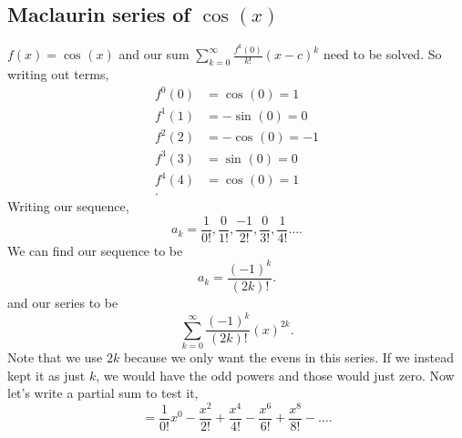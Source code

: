 \documentclass[a4paper]{article}
\begin{document}
\subsection*{Maclaurin series of $ \cos^{  } \left( x \right)  $}%
\begin{exampleblock}{}
	 $ f\left( x \right) =\cos^{  } \left( x \right)  $ and our sum $ \sum_{ k=0 } ^{ \infty } \frac{ f^{ k }\left( 0 \right)  }{ k! }\left( x-c \right) ^{ k } $ need to be solved. So writing out terms,
	 \begin{align*}
			f^{ 0 }\left( 0 \right) &= \cos^{  } \left( 0 \right) =1 \\
			f^{ 1 }\left( 1 \right) &= -\sin^{  } \left( 0 \right) =0 \\
			f^{ 2 }\left( 2 \right) &= -\cos^{  } \left( 0 \right) =-1 \\
			f^{ 3 }\left( 3 \right) &= \sin^{  } \left( 0 \right) =0 \\
			f^{ 4 }\left( 4 \right) &= \cos^{  } \left( 0 \right) =1 \\
	 .\end{align*}
	 Writing our sequence,
	 \[
		a_k=\frac{ 1 }{ 0! } ,\frac{ 0 }{ 1! } ,\frac{ -1 }{ 2! } ,\frac{ 0 }{ 3! } ,\frac{ 1 }{ 4! }\ldots
	 .\] 
	 We can find our sequence to be 
	 \[
	 a_k=\frac{ \left( -1 \right) ^{ k } }{ \left( 2k \right) ! }
	 .\] 
	 and our series to be 
	 \[
	 \sum_{ k=0 } ^{ \infty } \frac{ \left( -1 \right) ^{ k } }{ \left( 2k \right) ! }\left( x \right) ^{ 2k }
	 .\] 
		Note that we use $ 2k $ because we only want the evens in this series. If we instead kept it as just $ k $, we would have the odd powers and those would just zero. Now let's write a partial sum to test it,
		\[
		=\frac{ 1 }{ 0! } x^{ 0 }-\frac{ x^2 }{ 2! } + \frac{ x^{ 4 } }{ 4! }-\frac{ x^{ 6 } }{ 6! } + \frac{ x^{ 8 } }{ 8! } - \ldots
		.\] 

\end{exampleblock}
\end{document}
